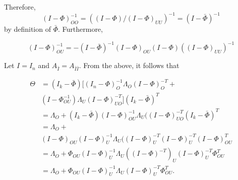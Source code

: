 \documentclass[accepted]{uai2021} %
\begin{document}
Therefore, $$(I - {\Phi})_{OO}^{-1} = ((I - {\Phi})/(I - 
{\Phi})_{UU})^{-1} = (I- \bar{\Phi})^{-1}$$ by definition of 
$\bar{\Phi}$. 
Furthermore, 

$$
(I-{\Phi})_{OU}^{-1} = 
-(I-\bar{\Phi})^{-1}(I-{\Phi})_{OU}(I-{\Phi})((I-{\Phi})_{UU})^{-1}
$$

Let $I = I_n$ and $A_{\bar{I}}=A_{\bar{I}\bar{I}}$. From the above, it 
follows 
that

\begin{align*}
\Theta & = (I_k - \bar{\Phi})[(I_n - 
{\Phi})_{O}^{-1}{\Lambda}_{O}(I - {\Phi})_{O}^{-T} + \\ 
&  
(I 
- 
{\Phi}_{OU}^{-1}){\Lambda}_{U}(I - 
{\Phi})_{UO}^{-T}](I_k - 
\bar{\Phi})^T \\
& = {\Lambda}_{O} + (I_k - \bar{\Phi})(I 
- 
{\Phi})_{OU}^{-1}{\Lambda}_{U}((I - 
{\Phi})_{UO}^{-T}(I_k - 
\bar{\Phi})^T \\
& = {\Lambda}_{O} + \\ & (I - {\Phi})_{OU}(I - 
{\Phi})_{U}^{-1}{\Lambda}_{U}((I - 
{\Phi})_{U}^{-T}(I - 
{\Phi})_{U}^{-T}(I - 
{\Phi})_{OU}^T \\
& = {\Lambda}_{O} + {\Phi}_{OU}(I - 
{\Phi})_{U}^{-1}{\Lambda}_{U}((I - 
{\Phi})^{-T})_{U}(I - 
{\Phi})_{U}^{-T} 
{\Phi}_{OU}^T \\
& = {\Lambda}_{O} + {\Phi}_{OU}(I - 
{\Phi})_{U}^{-1}{\Lambda}_{U} (I - 
{\Phi})_{U}^{-T}
{\Phi}_{OU}^T.
\end{align*}



\end{document}
